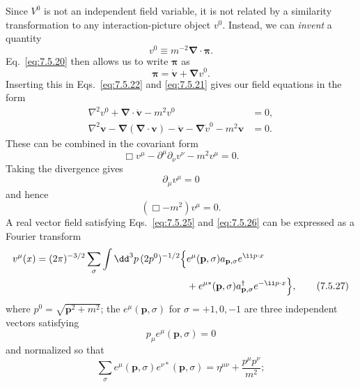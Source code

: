 Since $V^0$ is not an independent field variable, it is not related by a
similarity transformation to any interaction-picture object $v^0$. Instead,
we can \emph{invent} a quantity
\begin{equation}
v^0\equiv m^{-2}\boldsymbol\nabla\cdot\boldsymbol\pi.
\tag{7.5.22}\label{eq:7.5.22}
\end{equation}
Eq.~\eqref{eq:7.5.20} then allows us to write $\boldsymbol\pi$ as
\begin{equation}
\boldsymbol\pi=\dot{\mathbf v}+\boldsymbol\nabla v^0.
\tag{7.5.23}\label{eq:7.5.23}
\end{equation}
Inserting this in Eqs.~\eqref{eq:7.5.22} and \eqref{eq:7.5.21} gives our field equations in the
form
\begin{align*}
\nabla^2v^0+\boldsymbol\nabla\cdot\dot{\mathbf v}-m^2v^0&=0,\\
\nabla^2\mathbf v-\boldsymbol\nabla(\boldsymbol\nabla\cdot\mathbf v)
-\ddot{\mathbf v}-\boldsymbol\nabla\dot v^0-m^2\mathbf v&=0.
\end{align*}
These can be combined in the covariant form
\begin{equation}
\Box v^\mu-\partial^\mu\partial_\nu v^\nu-m^2v^\mu=0.
\tag{7.5.24}\label{eq:7.5.24}
\end{equation}
Taking the divergence gives
\begin{equation}
\partial_\mu v^\mu=0
\tag{7.5.25}\label{eq:7.5.25}
\end{equation}
and hence
\begin{equation}
(\Box-m^2)v^\mu=0.
\tag{7.5.26}\label{eq:7.5.26}
\end{equation}
A real vector field satisfying Eqs.~\eqref{eq:7.5.25} and \eqref{eq:7.5.26} can be expressed as
a Fourier transform
\begin{align}
v^\mu(x)=(2\pi)^{-3/2}\sum_\sigma\int \dd^3p\,(2p^0)^{-1/2}
\Bigl\{&e^\mu(\mathbf p,\sigma)a_{\mathbf p,\sigma}e^{\ii p\cdot x}\notag\\
&+e^{\mu*}(\mathbf p,\sigma)a^\dagger_{\mathbf p,\sigma}e^{-\ii p\cdot x}\Bigr\},
\tag{7.5.27}\label{eq:7.5.27}
\end{align}
where $p^0=\sqrt{\mathbf p^2+m^2}$; the $e^\mu(\mathbf p,\sigma)$ for
$\sigma=+1,0,-1$ are three independent vectors satisfying
\begin{equation}
p_\mu e^\mu(\mathbf p,\sigma)=0
\tag{7.5.28}\label{eq:7.5.28}
\end{equation}
and normalized so that
\begin{equation}
\sum_\sigma e^\mu(\mathbf p,\sigma)e^{\nu*}(\mathbf p,\sigma)
=\eta^{\mu\nu}+\frac{p^\mu p^\nu}{m^2};
\tag{7.5.29}\label{eq:7.5.29}
\end{equation}
